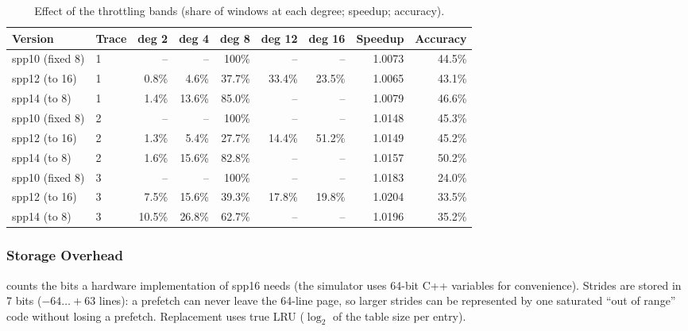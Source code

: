 \documentclass[12pt, a4paper]{article}
\newcommand{\tablesetup}{\small\renewcommand{\arraystretch}{1.15}\setlength{\tabcolsep}{4pt}}
\newcommand{\colhead}[1]{\textbf{#1}}
\begin{document}
\begin{table}[htbp]
\centering
\caption{Effect of the throttling bands (share of windows at each degree; speedup; accuracy).}\label{tab:throttle}
\tablesetup
\footnotesize
\begin{tabular}{llrrrrrrr}
\toprule
\rowcolor{tablehead}\colhead{Version} & \colhead{Trace} & \colhead{deg 2} & \colhead{deg 4} & \colhead{deg 8} & \colhead{deg 12} & \colhead{deg 16} & \colhead{Speedup} & \colhead{Accuracy} \\
\midrule
spp10 (fixed 8) & 1 & -- & -- & 100\% & -- & -- & 1.0073 & 44.5\% \\
spp12 (to 16)   & 1 & 0.8\% & 4.6\% & 37.7\% & 33.4\% & 23.5\% & 1.0065 & 43.1\% \\
spp14 (to 8)    & 1 & 1.4\% & 13.6\% & 85.0\% & -- & -- & 1.0079 & 46.6\% \\
\midrule
spp10 (fixed 8) & 2 & -- & -- & 100\% & -- & -- & 1.0148 & 45.3\% \\
spp12 (to 16)   & 2 & 1.3\% & 5.4\% & 27.7\% & 14.4\% & 51.2\% & 1.0149 & 45.2\% \\
spp14 (to 8)    & 2 & 1.6\% & 15.6\% & 82.8\% & -- & -- & 1.0157 & 50.2\% \\
\midrule
spp10 (fixed 8) & 3 & -- & -- & 100\% & -- & -- & 1.0183 & 24.0\% \\
spp12 (to 16)   & 3 & 7.5\% & 15.6\% & 39.3\% & 17.8\% & 19.8\% & 1.0204 & 33.5\% \\
spp14 (to 8)    & 3 & 10.5\% & 26.8\% & 62.7\% & -- & -- & 1.0196 & 35.2\% \\
\bottomrule
\end{tabular}
\end{table}

\subsubsection{Storage Overhead}\label{sec:spp-storage}
 counts the bits a hardware implementation of spp16
needs (the simulator uses 64-bit C++ variables for convenience). Strides are
stored in 7 bits ($-64\ldots+63$ lines): a prefetch can never leave the 64-line
page, so larger strides can be represented by one saturated ``out of range''
code without losing a prefetch. Replacement uses true LRU ($\log_2$ of the
table size per entry).
\end{document}
